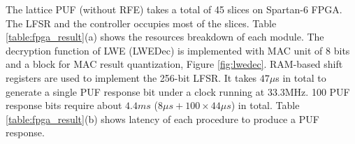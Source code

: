 


The lattice PUF (without RFE) takes a total of 45 slices on Spartan-6 FPGA. The LFSR and the controller occupies most of the slices. Table %
\ref{table:fpga_result}(a) shows the resources breakdown of each module. The decryption function of LWE (LWEDec) is implemented with MAC unit of 8 bits and a block for MAC result quantization, Figure \ref{fig:lwedec}.
RAM-based shift registers are used to implement the 256-bit LFSR. It takes $47\mu$s in total to generate a single PUF response bit under a clock running at 33.3MHz. 100 PUF response bits require about $4.4ms$ ($8\mu s + 100\times 44\mu s$) in total. Table %
\ref{table:fpga_result}(b) shows latency of each procedure to produce a PUF response.

